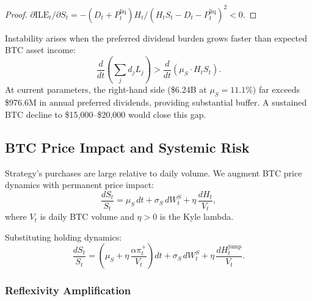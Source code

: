 \begin{proof}
  $\partial\mathrm{ILE}_t/\partial S_t = -(D_t + P_t^{\mathrm{liq}})H_t /
  (H_tS_t - D_t - P_t^{\mathrm{liq}})^2 < 0$.
\end{proof}

\begin{corollary}\label{cor:leverage_spiral}
  Instability arises when the preferred dividend burden grows faster than
  expected BTC asset income:
  \begin{equation}
    \frac{d}{dt}\!\left(\sum_j d_j L_j\right) >
    \frac{d}{dt}\!\left(\mu_S \cdot H_t S_t\right).
  \end{equation}
  At current parameters, the right-hand side (\$6.24B at $\mu_S = 11.1\%$)
  far exceeds \$976.6M in annual preferred dividends, providing substantial
  buffer.  A sustained BTC decline to \$15,000--\$20,000 would close this gap.
\end{corollary}

\subsection{BTC Price Impact and Systemic Risk}
\label{sec:market_impact_theory}

Strategy's purchases are large relative to daily volume.  We augment BTC
price dynamics with permanent price impact:
\begin{equation}
  \label{eq:price_impact}
  \frac{dS_t}{S_t} = \mu_S\,dt + \sigma_S\,dW_t^S
  + \eta\,\frac{dH_t}{V_t},
\end{equation}
where $V_t$ is daily BTC volume and $\eta > 0$ is the Kyle lambda.

Substituting holding dynamics:
\begin{equation}
  \frac{dS_t}{S_t} = \left(\mu_S + \eta\,\frac{\alpha\pi_t^+}{V_t}\right)dt
  + \sigma_S\,dW_t^S + \eta\,\frac{dH_t^{\mathrm{jump}}}{V_t}.
\end{equation}

\subsubsection{Reflexivity Amplification}

